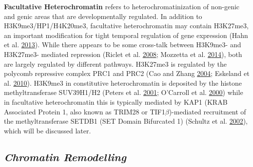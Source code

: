\documentclass[onehalf,12pt]{beavtex}
\begin{document}
  \textbf{Facultative Heterochromatin} refers to heterochromatinization of
  non-genic and genic areas that are developmentally regulated. In
  addition to H3K9me3/HP1/H4K20me3, facultative heterochromatin may
  contain H3K27me3, an important modification for tight temporal
  regulation of gene expression (Hahn et al.
  \protect\hyperlink{ref-HahnDynamics5HydroxymethylcytosineChromatin2013}{2013}).
  While there appears to be some cross-talk between H3K9me3- and H3K27me3-
  mediated repression (Riclet et al.
  \protect\hyperlink{ref-RicletDisruptionInteractionTranscriptional2008}{2008};
  Mozzetta et al.
  \protect\hyperlink{ref-MozzettahistoneH3lysine2014}{2014}), both are
  largely regulated by different pathways. H3K27me3 is regulated by the
  polycomb repressive complex PRC1 and PRC2 (Cao and Zhang
  \protect\hyperlink{ref-CaofunctionsEZH2mediatedmethylation2004}{2004};
  Eskeland et al.
  \protect\hyperlink{ref-EskelandRing1BCompactsChromatin2010}{2010}).
  H3K9me3 in constitutive heterochromatin is deposited by the histone
  methyltransferase SUV39H1/H2 (Peters et al.
  \protect\hyperlink{ref-PetersLossSuv39hHistone2001}{2001}; O'Carroll et
  al.
  \protect\hyperlink{ref-OCarrollIsolationCharacterizationofSuv39h22000}{2000})
  while in facultative heterochromatin this is typically mediated by KAP1
  (KRAB Associated Protein 1, also known as TRIM28 or
  TIF1\(\beta\))-mediated recruitment of the methyltransferase SETDB1 (SET
  Domain Bifurcated 1) (Schultz et al.
  \protect\hyperlink{ref-SchultzSETDB1novelKAP1associated2002a}{2002}),
  which will be discussed later.
  
  \subsection*{\texorpdfstring{\emph{Chromatin
  Remodelling}}{Chromatin Remodelling}}\label{chromatin-remodelling}
  
\end{document}
